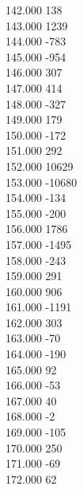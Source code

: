{ 142.000	138 \\
 143.000	1239 \\
 144.000	-783 \\
 145.000	-954 \\
 146.000	307 \\
 147.000	414 \\
 148.000	-327 \\
 149.000	179 \\
 150.000	-172 \\
 151.000	292 \\
 152.000	10629 \\
 153.000	-10680 \\
 154.000	-134 \\
 155.000	-200 \\
 156.000	1786 \\
 157.000	-1495 \\
 158.000	-243 \\
 159.000	291 \\
 160.000	906 \\
 161.000	-1191 \\
 162.000	303 \\
 163.000	-70 \\
 164.000	-190 \\
 165.000	92 \\
 166.000	-53 \\
 167.000	40 \\
 168.000	-2 \\
 169.000	-105 \\
 170.000	250 \\
 171.000	-69 \\
 172.000	62 \\
}
